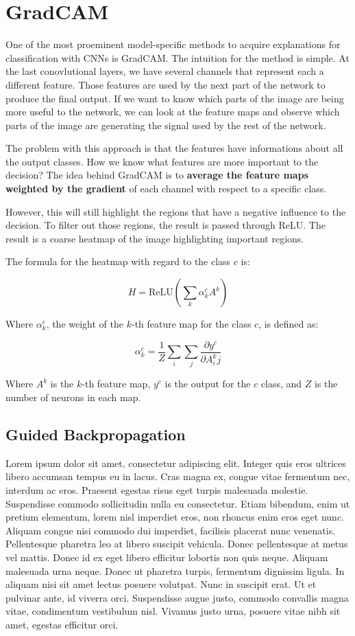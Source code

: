 \section{GradCAM}

One of the most proeminent model-specific methods to acquire explanations for classification with CNNs is GradCAM. The intuition for the method is simple. At the last conovlutional layers, we have several channels that represent each a different feature. Those features are used by the next part of the network to produce the final output. If we want to know which parts of the image are being more useful to the network, we can look at the feature maps and observe which parts of the image are generating the signal used by the rest of the network. 

The problem with this approach is that the features have informations about all the output classes. How we know what features are more important to the decision? The idea behind GradCAM is to \textbf{average the feature maps weighted by the gradient} of each channel with respect to a specific class. 

However, this will still highlight the regions that have a negative influence to the decision. To filter out those regions, the result is passed through ReLU. The result is a coarse heatmap of the image highlighting important regions.

The formula for the heatmap with regard to the class $c$ is:

\[
    H  = \text{ReLU}(\sum_k \alpha_k^c A^k)
\]

Where $\alpha_k^c$, the weight of the $k$-th feature map for the class $c$, is defined as:

\[
    \alpha_k^c=\frac{1}{Z} \sum_i \sum_j \frac{\partial y^c}{\partial A^k_ij}
\]

Where $A^k$ is the $k$-th feature map, $y^c$ is the output for the $c$ class, and $Z$ is the number of neurons in each map.

\subsection{Guided Backpropagation}
Lorem ipsum dolor sit amet, consectetur adipiscing elit. Integer quis eros ultrices libero accumsan tempus eu in lacus. Cras magna ex, congue vitae fermentum nec, interdum ac eros. Praesent egestas risus eget turpis malesuada molestie. Suspendisse commodo sollicitudin nulla eu consectetur. Etiam bibendum, enim ut pretium elementum, lorem nisl imperdiet eros, non rhoncus enim eros eget nunc. Aliquam congue nisi commodo dui imperdiet, facilisis placerat nunc venenatis. Pellentesque pharetra leo at libero suscipit vehicula. Donec pellentesque at metus vel mattis. Donec id ex eget libero efficitur lobortis non quis neque. Aliquam malesuada urna neque. Donec ut pharetra turpis, fermentum dignissim ligula. In aliquam nisi sit amet lectus posuere volutpat. Nunc in suscipit erat. Ut et pulvinar ante, id viverra orci. Suspendisse augue justo, commodo convallis magna vitae, condimentum vestibulum nisl. Vivamus justo urna, posuere vitae nibh sit amet, egestas efficitur orci. 
